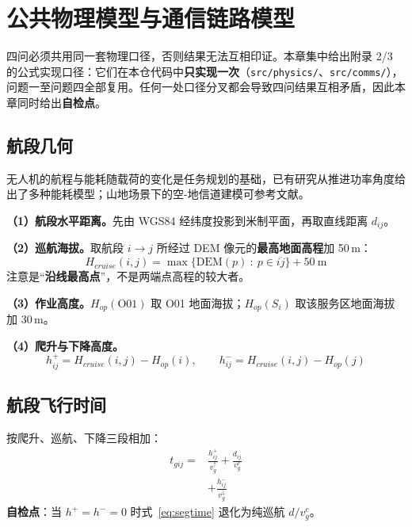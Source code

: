 \section{公共物理模型与通信链路模型}\label{sec:common}

四问必须共用同一套物理口径，否则结果无法互相印证。本章集中给出附录 2/3 的公式实现口径：它们在本仓代码中\textbf{只实现一次}（\texttt{src/physics/}、\texttt{src/comms/}），问题一至问题四全部复用。任何一处口径分叉都会导致四问结果互相矛盾，因此本章同时给出\textbf{自检点}。

\subsection{航段几何}

无人机的航程与能耗随载荷的变化是任务规划的基础，已有研究从推进功率角度给出了多种能耗模型\cite{dai2022uavenergy}；山地场景下的空-地信道建模可参考文献\cite{cui2019mountainchannel}。

\textbf{（1）航段水平距离。}先由 WGS84 经纬度投影到米制平面，再取直线距离 $d_{ij}$。

\textbf{（2）巡航海拔。}取航段 $i\to j$ 所经过 DEM 像元的\textbf{最高地面高程}加 50\,m：
\begin{equation}
	H_{cruise}(i,j)=\max\{\mathrm{DEM}(p)\ :\ p\in \overline{ij}\}+50\ \text{m}
	\label{eq:cruise}
\end{equation}
注意是“\textbf{沿线最高点}”，不是两端点高程的较大者。

\textbf{（3）作业高度。}$H_{op}(\mathrm{O01})$ 取 O01 地面海拔；$H_{op}(S_i)$ 取该服务区地面海拔加 30\,m。

\textbf{（4）爬升与下降高度。}
\begin{equation}
	h_{ij}^{+}=H_{cruise}(i,j)-H_{op}(i),\qquad
	h_{ij}^{-}=H_{cruise}(i,j)-H_{op}(j)
\end{equation}

\subsection{航段飞行时间}

按爬升、巡航、下降三段相加：
\begin{equation}
	\begin{aligned}
		t_{gij}={}&\frac{h_{ij}^{+}}{v_{g}^{\uparrow}}
		          +\frac{d_{ij}}{v_{g}^{c}}\\
		        &+\frac{h_{ij}^{-}}{v_{g}^{\downarrow}}
	\end{aligned}
	\label{eq:segtime}
\end{equation}
\textbf{自检点}：当 $h^{+}=h^{-}=0$ 时式~\eqref{eq:segtime} 退化为纯巡航 $d/v_{g}^{c}$。

